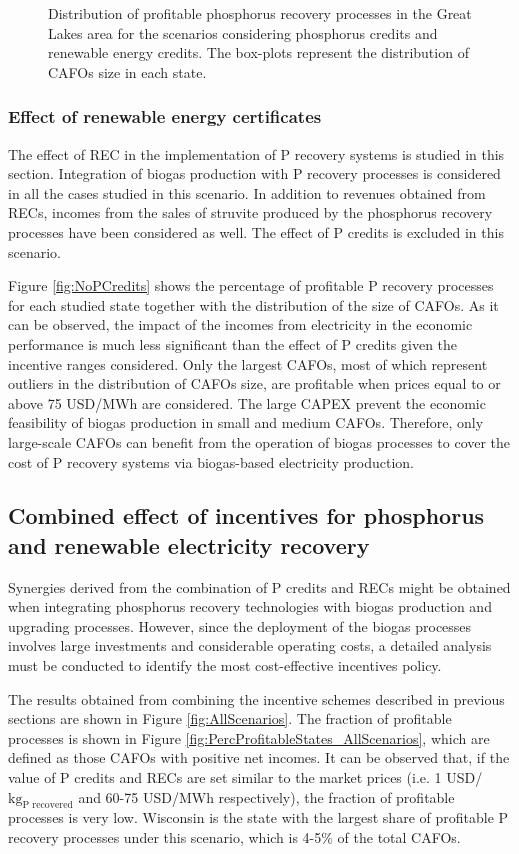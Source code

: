 \begin{refsection}[referencesCh5]
\begin{figure}[h]
	\caption{Distribution of profitable phosphorus recovery processes in the Great Lakes area for the scenarios considering phosphorus credits and renewable energy credits. The box-plots represent the distribution of CAFOs size in each state.}
	\label{fig:SingleIncentives}
\end{figure}

\subsubsection{Effect of renewable energy certificates}\label{section:Electricity_price}
The effect of REC in the implementation of P recovery systems is studied in this section. Integration of biogas production with P recovery processes is considered in all the cases studied in this scenario. In addition to revenues obtained from RECs, incomes from the sales of struvite produced by the phosphorus recovery processes have been considered as well. The effect of P credits is excluded in this scenario.

Figure \ref{fig:NoPCredits} shows the percentage of profitable P recovery processes for each studied state together with the distribution of the size of CAFOs. As it can be observed, the impact of the incomes from electricity in the economic performance is much less significant than the effect of P credits given the incentive ranges considered. Only the largest CAFOs, most of which represent outliers in the distribution of CAFOs size, are profitable when prices equal to or above 75 USD/MWh are considered. The large CAPEX prevent the economic feasibility of biogas production in small and medium CAFOs. Therefore, only large-scale CAFOs can benefit from the operation of biogas processes to cover the cost of P recovery systems via biogas-based electricity production.

\subsection{Combined effect of incentives for phosphorus and renewable electricity recovery}\label{section:CombIncent}
Synergies derived from the combination of P credits and RECs might be obtained when integrating phosphorus recovery technologies with biogas production and upgrading processes.
However, since the deployment of the biogas processes involves large investments and considerable operating costs, a detailed analysis must be conducted to identify the most cost-effective incentives policy. 

The results obtained from combining the incentive schemes described in previous sections are shown in Figure \ref{fig:AllScenarios}. The fraction of profitable processes is shown in Figure \ref{fig:PercProfitableStates_AllScenarios}, which are defined as those CAFOs with positive net incomes. It can be observed that, if the value of P credits and RECs are set similar to the market prices (i.e. 1 USD/$\text{kg}_\text{P recovered}$ and 60-75 USD/MWh respectively), the fraction of profitable processes is very low. Wisconsin is the state with the largest share of profitable P recovery processes under this scenario, which is 4-5\% of the total CAFOs.


\end{refsection}
